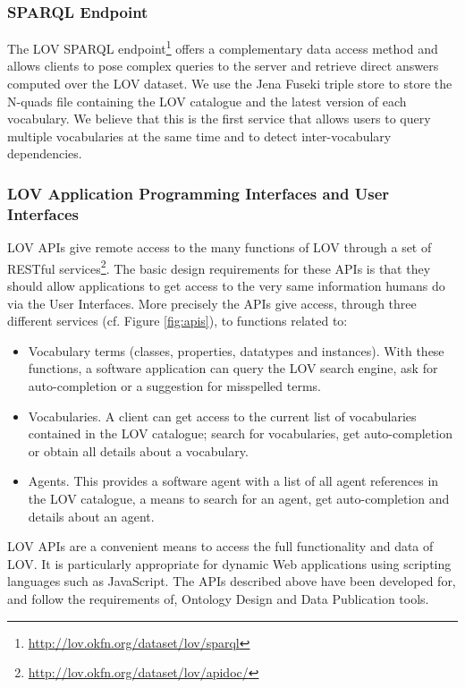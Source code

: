 \documentclass{iosart2c}
\begin{document}
\subsubsection{SPARQL Endpoint}
The LOV SPARQL endpoint\footnote{\url{http://lov.okfn.org/dataset/lov/sparql}} offers a complementary data access method and allows clients to pose complex queries to the server and retrieve direct answers computed over the LOV dataset. We use the Jena Fuseki triple store to store the N-quads file containing the LOV catalogue and the latest version of each vocabulary. We believe that this is the first service that allows users to query multiple vocabularies at the same time and to detect inter-vocabulary dependencies. 

\subsubsection{LOV Application Programming Interfaces and User Interfaces}
LOV APIs give remote access to the many functions of LOV through a set of RESTful services\footnote{\url{http://lov.okfn.org/dataset/lov/apidoc/}}. The basic design requirements for these APIs is that they should allow applications to get access to the very same information humans do via the User Interfaces. More precisely the APIs give access, through three different services (cf. Figure \ref{fig:apis}), to functions related to:
\begin{itemize} 
			\item Vocabulary terms (classes, properties, datatypes and instances). With these functions, a software application can query the LOV search engine, ask for auto-completion or a suggestion for misspelled terms.
			\item Vocabularies. A client can get access to the current list of vocabularies contained in the LOV catalogue; search for vocabularies, get auto-completion or obtain all details about a vocabulary.
			\item Agents. This provides a software agent with a list of all agent references in the LOV catalogue, a means to search for an agent, get auto-completion and details about an agent.
		\end{itemize}
LOV APIs are a convenient means to access the full functionality and data of LOV. It is particularly appropriate for dynamic Web applications using scripting languages such as JavaScript. The APIs described above have been developed for, and follow the requirements of, Ontology Design and Data Publication tools. 
\end{document}
